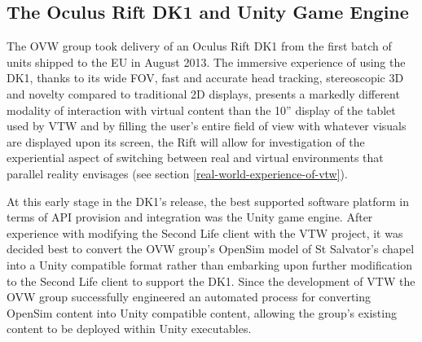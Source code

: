 


\subsection{The Oculus Rift DK1 and Unity Game Engine}

The OVW group took delivery of an Oculus Rift DK1 from the first batch of units shipped to the EU in August 2013. The immersive experience of using the DK1, thanks to its wide FOV, fast and accurate head tracking, stereoscopic 3D and novelty compared to traditional 2D displays, presents a markedly different modality of interaction with virtual content than the 10'' display of the tablet used by VTW and by filling the user's entire field of view with whatever visuals are displayed upon its screen, the Rift will allow for investigation of the experiential aspect of switching between real and virtual environments that parallel reality envisages (see section \ref{real-world-experience-of-vtw}).

At this early stage in the DK1's release, the best supported software platform in terms of API provision and integration was the Unity game engine. After experience with modifying the Second Life client with the VTW project, it was decided best to convert the OVW group's OpenSim model of St Salvator's chapel into a Unity compatible format rather than embarking upon further modification to the Second Life client to support the DK1. Since the development of VTW the OVW group successfully engineered an automated process for converting OpenSim content into Unity compatible content, allowing the group's existing content to be deployed within Unity executables.

